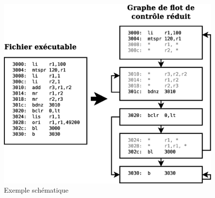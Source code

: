 \documentclass{beamer}
\begin{document}
    \begin{frame}\small
      \frametitle{\secname}

      \begin{figure}
        \centering
        \includegraphics[scale=.3]{cfg.eps}
        \caption{Exemple schématique}
      \end{figure}
    \end{frame}
    
\end{document}
